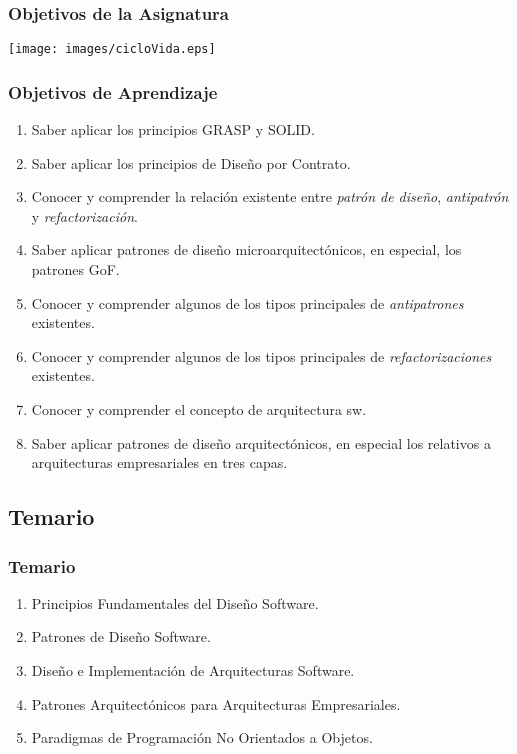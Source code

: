 \documentclass[animated,a4paper,slidestop,xcolor=pst,blue]{beamer}
\begin{document}
\begin{frame}[c]
	\frametitle{Objetivos de la Asignatura}
    \begin{center}
        \texttt{[image: images/cicloVida.eps]}
    \end{center}
\end{frame}

\begin{frame}[c]
	\frametitle{Objetivos de Aprendizaje}
    \begin{enumerate}[<+->]
            \item Saber aplicar los principios \alert{GRASP} y \alert{SOLID}.
            \item Saber aplicar los principios de \alert{Diseño por Contrato}.
            \item Conocer y comprender la relación existente entre \alert{\emph{patrón de diseño}}, \alert{\emph{antipatrón}} y \alert{\emph{refactorización}}.
            \item Saber aplicar patrones de diseño microarquitectónicos, en especial, los \alert{patrones GoF}.
            \item Conocer y comprender algunos de los tipos principales de \alert{\emph{antipatrones}} existentes.
            \item Conocer y comprender algunos de los tipos principales de \alert{\emph{refactorizaciones}} existentes.
            \item Conocer y comprender el concepto de arquitectura sw.
            \item Saber aplicar patrones de diseño arquitectónicos, en especial los relativos a \alert{arquitecturas empresariales en tres capas}.
    \end{enumerate}
\end{frame}

\subsection{Temario}

\begin{frame}[c]
	\frametitle{Temario}
	\begin{enumerate}
		\item<1-> Principios Fundamentales del Diseño Software.
		\item<2-> Patrones de Diseño Software.
		\item<3-> Diseño e Implementación de Arquitecturas Software.
		\item<4-> Patrones Arquitectónicos para Arquitecturas Empresariales.
        \item<5-> Paradigmas de Programación No Orientados a Objetos.
	\end{enumerate}
\end{frame}
\end{document}
